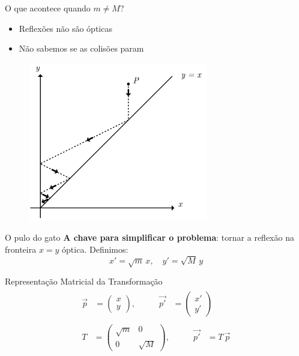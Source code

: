 \documentclass{beamer}
\begin{document}
\begin{frame}{O que acontece quando $m \neq M$?}
  \begin{itemize}
    \item Reflexões não são ópticas
    \item Não sabemos se as colisões param
  \end{itemize}
  \begin{figure}
    \centering
    \includegraphics[width=0.7\textwidth]{images/image-2.png}
  \end{figure}
\end{frame}

\begin{frame}{O pulo do gato}
  \textbf{A chave para simplificar o problema}: tornar a reflexão na fronteira $x=y$ óptica. Definimos:
  \begin{equation*}
    x' = \sqrt{m}\,x,\quad y' = \sqrt{M}\,y
  \end{equation*}
\end{frame}

\begin{frame}{Representação Matricial da Transformação}
  \begin{gather*}
    \begin{alignedat}{2}
      \vec{p} &= \begin{pmatrix} x \\ y \end{pmatrix}, &\qquad \vec{p'} &= \begin{pmatrix} x' \\ y' \end{pmatrix}
    \end{alignedat}
    \\[2ex] %
    \begin{alignedat}{2}
      T &= \begin{pmatrix} \sqrt{m} & 0 \\ 0 & \sqrt{M} \end{pmatrix}, &\qquad \vec{p'} &= T\,\vec{p}
    \end{alignedat}
  \end{gather*}
\end{frame}
\end{document}
